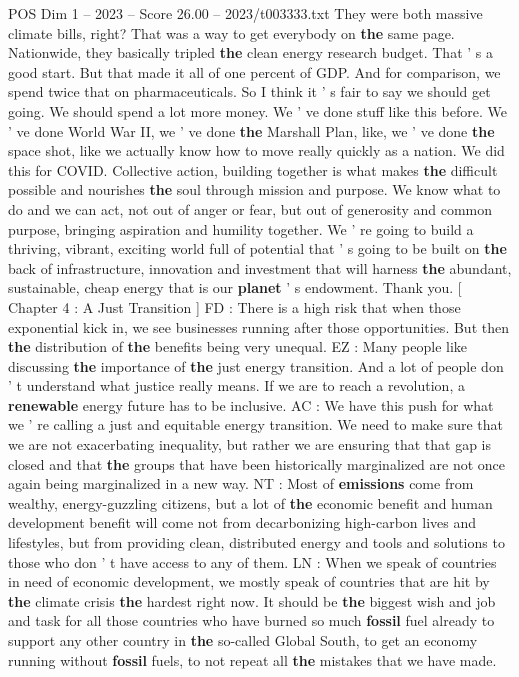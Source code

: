 \begin{textsample}{POS Dim 1 – 2023 – Score 26.00 – 2023/t003333.txt}
They were both massive climate bills, right?
That was a way to get everybody on \textbf{the} same page.
Nationwide, they basically tripled \textbf{the} clean energy research budget.
That ' s a good start.
But that made it all of one percent of GDP.
And for comparison, we spend twice that on pharmaceuticals.
So I think it ' s fair to say we should get going.
We should spend a lot more money.
We ' ve done stuff like this before.
We ' ve done World War II, we ' ve done \textbf{the} Marshall Plan, like, we ' ve done \textbf{the} space shot, like we actually know how to move really quickly as a nation.
We did this for COVID.
Collective action, building together is what makes \textbf{the} difficult possible and nourishes \textbf{the} soul through mission and purpose.
We know what to do and we can act, not out of anger or fear, but out of generosity and common purpose, bringing aspiration and humility together.
We ' re going to build a thriving, vibrant, exciting world full of potential that ' s going to be built on \textbf{the} back of infrastructure, innovation and investment that will harness \textbf{the} abundant, sustainable, cheap energy that is our \textbf{planet} ' s endowment.
Thank you. [ Chapter 4 : A Just Transition ] FD : There is a high risk that when those exponential kick in, we see businesses running after those opportunities.
But then \textbf{the} distribution of \textbf{the} benefits being very unequal.
EZ : Many people like discussing \textbf{the} importance of \textbf{the} just energy transition.
And a lot of people don ' t understand what justice really means.
If we are to reach a revolution, a \textbf{renewable} energy future has to be inclusive.
AC : We have this push for what we ' re calling a just and equitable energy transition.
We need to make sure that we are not exacerbating inequality, but rather we are ensuring that that gap is closed and that \textbf{the} groups that have been historically marginalized are not once again being marginalized in a new way.
NT : Most of \textbf{emissions} come from wealthy, energy-guzzling citizens, but a lot of \textbf{the} economic benefit and human development benefit will come not from decarbonizing high-carbon lives and lifestyles, but from providing clean, distributed energy and tools and solutions to those who don ' t have access to any of them.
LN : When we speak of countries in need of economic development, we mostly speak of countries that are hit by \textbf{the} climate crisis \textbf{the} hardest right now.
It should be \textbf{the} biggest wish and job and task for all those countries who have burned so much \textbf{fossil} fuel already to support any other country in \textbf{the} so-called Global South, to get an economy running without \textbf{fossil} fuels, to not repeat all \textbf{the} mistakes that we have made.

\end{textsample}
